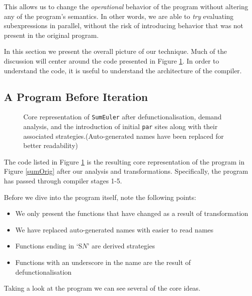 This allows us to change the \emph{operational} behavior of the program without
altering any of the program's semantics. In other words, we are able to \emph{try}
evaluating subexpressions in parallel, without the risk of introducing behavior
that was not present in the original program.


In this section we present the overall picture of our technique. Much of the
discussion will center around the code presented in Figure \ref{sumLast}. In
order to understand the code, it is useful to understand the architecture of the
compiler.

\subsection{A Program Before Iteration}

\begin{figure}[t!]
  
\caption{Core representation of \texttt{SumEuler} after defunctionalisation, demand
         analysis, and the introduction of initial \texttt{par} sites along
         with their associated strategies.(Auto-generated names have been
         replaced for better readability)}
\label{sumLast}
\end{figure}

The code listed in Figure \ref{sumLast} is the resulting core representation
of the program in Figure \ref{sumOrig} after our analysis and transformations.
Specifically, the program has passed through compiler stages 1-5.

Before we dive into the program itself, note the following points:

\begin{itemize}
    \item We only present the functions that have changed as a result of transformation
    \item We have replaced auto-generated names with easier to read names
    \item Functions ending in `S$N$' are derived strategies
    \item Functions with an underscore in the name are the result of defunctionalisation
\end{itemize}

Taking a look at the program we can see several of the core ideas.

